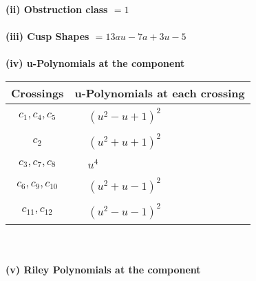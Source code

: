\documentclass[1p]{elsarticle_modified}
\theoremstyle{definition}
\begin{document}
\flushleft \textbf{(ii) Obstruction class $= 1$}\\~\\
\flushleft \textbf{(iii) Cusp Shapes $= 13 a u-7 a+3 u-5$}\\~\\
\newpage\renewcommand{\arraystretch}{1}
\flushleft \textbf{(iv) u-Polynomials at the component}\newline \\
\begin{tabular}{m{50pt}|m{274pt}}
Crossings & \hspace{64pt}u-Polynomials at each crossing \\
\hline $$\begin{aligned}c_{1},c_{4},c_{5}\end{aligned}$$&$\begin{aligned}
&(u^2- u+1)^2
\end{aligned}$\\
\hline $$\begin{aligned}c_{2}\end{aligned}$$&$\begin{aligned}
&(u^2+u+1)^2
\end{aligned}$\\
\hline $$\begin{aligned}c_{3},c_{7},c_{8}\end{aligned}$$&$\begin{aligned}
&u^4
\end{aligned}$\\
\hline $$\begin{aligned}c_{6},c_{9},c_{10}\end{aligned}$$&$\begin{aligned}
&(u^2+u-1)^2
\end{aligned}$\\
\hline $$\begin{aligned}c_{11},c_{12}\end{aligned}$$&$\begin{aligned}
&(u^2- u-1)^2
\end{aligned}$\\
\hline
\end{tabular}\\~\\
\newpage\renewcommand{\arraystretch}{1}
\flushleft \textbf{(v) Riley Polynomials at the component}\newline \\
\end{document}
